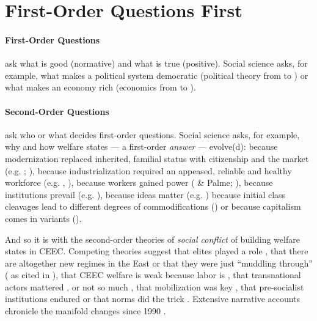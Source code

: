 \documentclass[11pt,a4paper,oneside]{article}
\begin{document}
\newpage

\section{First-Order Questions First}%

\paragraph{First-Order Questions} ask what is good (normative) and what is true (positive).
Social science asks, for example, what makes a political system democratic (political theory from \citeauthor{Aristoteles} to \citeauthor{Dahl-1989-aa}) or what makes an economy rich (economics from \citeauthor{Smith-1776-lq} to \citeauthor{Hicks1939}).

\paragraph{Second-Order Questions} ask who or what decides first-order questions.
Social science asks, for example, why and how welfare states --- a first-order \emph{answer} --- evolve(d):
	because modernization replaced inherited, familial status with citizenship and the market (e.g. \citeauthor{Titmuss1974}; \citeauthor{Marshall-1950-aa}),
	because industrialization required an appeased, reliable and healthy workforce (e.g. \citeauthor{Flora1981}, \citeauthor{Wilensky1975}),
	because workers gained power (\citeauthor{Korpi1983} \& Palme; \citeauthor{Jessop2002}),
	because institutions prevail (e.g. \citeauthor{Rothstein}),
	because ideas matter (e.g. \citeauthor{Stiller2009}) because initial class cleavages lead to different degrees of commodifications (\citeauthor{Esping-Andersen-1990-aa}) or
	because capitalism comes in variants (\citeauthor{HallSoskice-2001-aa}).

And so it is with the second-order theories of \emph{social conflict} of building welfare states in \gls{CEEC}.
Competing theories suggest that elites played a role \citep{Aidukaite2006},
	that there are altogether new regimes in the East \citep{Cerami2006} or
	that they were just ``muddling through'' (\citealt{Kovasc} as cited in \citealt[28]{Fuchs2008}),
	that \gls{CEEC} welfare is weak because labor is \citep{Crowley2002},
	that transnational actors mattered \citep{Orenstein2009}, or not so much \citep{Sissenich2005},
	that mobilization was key \citep{Vanhuysse2006a},
	that pre-socialist institutions endured \citep{Inglot2008} or that norms did the trick \citep{Schimmelfennig2001}.
Extensive narrative accounts chronicle the manifold changes since 1990 \citep[e.g.][ed]{Deacon1992}.
\end{document}

